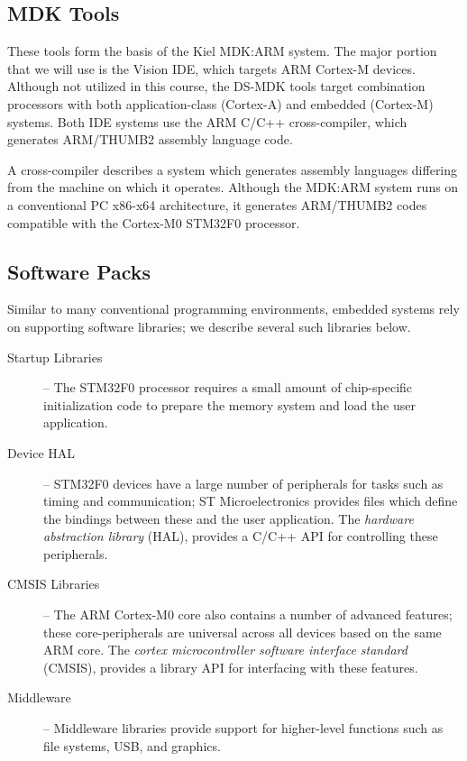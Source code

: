 \documentclass[11pt,fleqn]{book} %
\begin{document}
\subsection*{MDK Tools}
These tools form the basis of the Kiel MDK:ARM system. The major portion that we will use is the {\textmu}Vision IDE, which targets ARM Cortex-M devices. Although not utilized in this course, the DS-MDK tools target combination processors with both application-class (Cortex-A) and embedded (Cortex-M) systems. Both IDE systems use the ARM C/C++ cross-compiler, which generates ARM/THUMB2 assembly language code.

A cross-compiler describes a system which generates assembly languages differing from the machine on which it operates. Although the MDK:ARM system runs on a conventional PC x86-x64 architecture, it generates ARM/THUMB2 codes compatible with the Cortex-M0 STM32F0 processor.

\subsection*{Software Packs}
Similar to many conventional programming environments, embedded systems rely on supporting software libraries; we describe several such libraries below.

\begin{description}
	\item[Startup Libraries] -- The STM32F0 processor requires a small amount of chip-specific initialization code to prepare the memory system and load the user application.  
	\item[Device HAL] -- STM32F0 devices have a large number of peripherals for tasks such as timing and communication; ST Microelectronics provides files which define the bindings between these and the user application. The \textit{hardware abstraction library} (HAL), provides a C/C++ API for controlling these peripherals.
	\item[CMSIS Libraries] -- The ARM Cortex-M0 core also contains a number of advanced features; these core-peripherals are universal across all devices based on the same ARM core. The \textit{cortex microcontroller software interface standard} (CMSIS), provides a library API for interfacing with these features. 
	\item[Middleware] -- Middleware libraries provide support for higher-level functions such as file systems, USB, and graphics.
\end{description}


\end{document}
